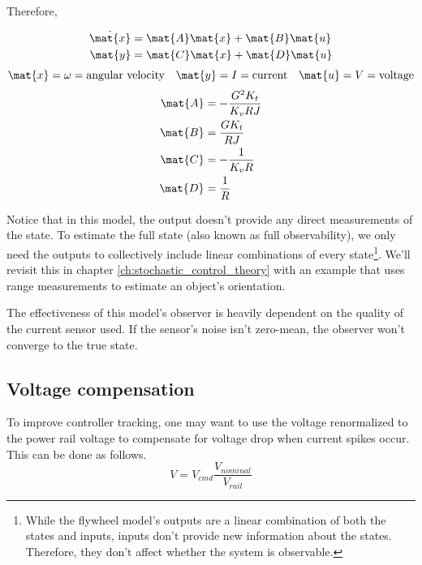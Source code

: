Therefore,
\begin{theorem}
  \begin{align*}
    \dot{\mat{x}} &= \mat{A} \mat{x} + \mat{B} \mat{u} \\
    \mat{y} &= \mat{C} \mat{x} + \mat{D} \mat{u}
  \end{align*}
  \begin{equation*}
    \mat{x} = \omega = \text{angular velocity}
    \quad
    \mat{y} = I = \text{current}
    \quad
    \mat{u} = V = \text{voltage}
  \end{equation*}
  \begin{align}
    \mat{A} &= -\frac{G^2 K_t}{K_v RJ} \\
    \mat{B} &= \frac{G K_t}{RJ} \\
    \mat{C} &= -\frac{1}{K_v R} \\
    \mat{D} &= \frac{1}{R}
  \end{align}
\end{theorem}

Notice that in this \gls{model}, the \gls{output} doesn't provide any direct
measurements of the \gls{state}. To estimate the full \gls{state} (also known as
full observability), we only need the \glspl{output} to collectively include
linear combinations of every \gls{state}\footnote{While the flywheel model's
outputs are a linear combination of both the states and inputs, \glspl{input}
don't provide new information about the \glspl{state}. Therefore, they don't
affect whether the system is observable.}. We'll revisit this in chapter
\ref{ch:stochastic_control_theory} with an example that uses range measurements
to estimate an object's orientation.

The effectiveness of this \gls{model}'s \gls{observer} is heavily dependent on
the quality of the current sensor used. If the sensor's noise isn't zero-mean,
the \gls{observer} won't converge to the true \gls{state}.

\subsection{Voltage compensation}

To improve controller \gls{tracking}, one may want to use the voltage
renormalized to the power rail voltage to compensate for voltage drop when
current spikes occur. This can be done as follows.
\begin{equation}
  V = V_{cmd} \frac{V_{nominal}}{V_{rail}}
\end{equation}

